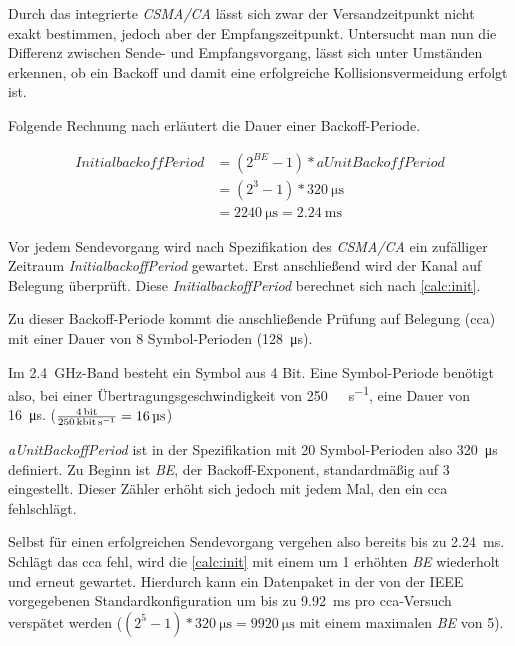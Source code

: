 Durch das integrierte \emph{CSMA/CA} lässt sich zwar der Versandzeitpunkt nicht
exakt bestimmen, jedoch aber der Empfangszeitpunkt. Untersucht man nun die
Differenz zwischen Sende- und Empfangsvorgang, lässt sich unter Umständen
erkennen, ob ein Backoff und damit eine erfolgreiche Kollisionsvermeidung
erfolgt ist.

Folgende Rechnung nach\cite{JENN} erläutert die Dauer einer Backoff-Periode.

\begin{align}\label{calc:init}
\mathit{InitialbackoffPeriod} &=(2^{BE}-1)*\mathit{aUnitBackoffPeriod} \\
&=(2^3-1)*\SI{320}{\micro\second}\nonumber \\
&= \SI{2240}{\micro\second} = \SI{2,24}{\milli\second} \nonumber 
\end{align}

Vor jedem Sendevorgang wird nach Spezifikation des \emph{CSMA/CA} ein zufälliger
Zeitraum \emph{InitialbackoffPeriod} gewartet. Erst anschließend wird der Kanal
auf Belegung überprüft. Diese \emph{InitialbackoffPeriod} berechnet sich nach
\autoref{calc:init}. 

Zu dieser Backoff-Periode kommt die anschließende Prüfung auf Belegung
(\gls{cca}) mit einer Dauer von 8 Symbol-Perioden (\SI{128}{\micro\second}). 

Im \SI{2,4}{\giga\hertz}-Band besteht ein Symbol aus 4 Bit. Eine Symbol-Periode
benötigt also, bei einer Übertragungsgeschwindigkeit von
\SI{250}{\kilo\bit\per\second}, eine Dauer von \SI{16}{\micro\second}.
($\frac{\SI{4}{\bit}}{\SI{250}{\kilo\bit\per\second}}=\SI{16}{\micro\second}$)

\emph{aUnitBackoffPeriod} ist in der Spezifikation mit 20 Symbol-Perioden also
\SI{320}{\micro\second} definiert. Zu Beginn ist \emph{BE}, der
Backoff-Exponent, standardmäßig auf 3 eingestellt. Dieser Zähler erhöht sich
jedoch mit jedem Mal, den ein \gls{cca} fehlschlägt.

Selbst für einen erfolgreichen Sendevorgang vergehen also bereits bis zu
\SI{2,24}{\milli\second}. Schlägt das \gls{cca} fehl, wird die
\autoref{calc:init} mit einem um 1 erhöhten \emph{BE} wiederholt und erneut
gewartet. Hierdurch kann ein Datenpaket in der von der IEEE vorgegebenen
Standardkonfiguration um bis zu \SI{9,92}{\milli\second} pro \gls{cca}-Versuch
verspätet werden ($(2^5-1)*\SI{320}{\micro\second = \SI{9920}{\micro\second}}$
mit einem maximalen \emph{BE} von 5).

